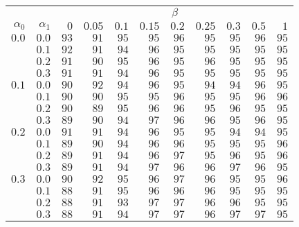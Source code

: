 \begin{tabular}{rr|rrrrrrrrr}
\hline\hline
 && \multicolumn{9}{c}{$\beta$}\\
 $\alpha_0$ & $\alpha_1$ & $0$ & $0.05$ & $0.1$ & $0.15$ & $0.2$ & $0.25$ & $0.3$ & $0.5$ & $1$ \\ 
 \hline
$0.0$ & $0.0$ & $93$ & $91$ & $95$ & $95$ & $96$ & $95$ & $95$ & $96$ & $95$\\ 
 & $0.1$ & $92$ & $91$ & $94$ & $96$ & $95$ & $95$ & $95$ & $95$ & $95$\\ 
 & $0.2$ & $91$ & $90$ & $95$ & $96$ & $95$ & $96$ & $95$ & $95$ & $95$\\ 
 & $0.3$ & $91$ & $91$ & $94$ & $96$ & $95$ & $95$ & $95$ & $95$ & $95$\\ 
\hline 
 $0.1$ & $0.0$ & $90$ & $92$ & $94$ & $96$ & $95$ & $94$ & $94$ & $96$ & $95$\\ 
 & $0.1$ & $90$ & $90$ & $95$ & $95$ & $96$ & $95$ & $95$ & $96$ & $96$\\ 
 & $0.2$ & $90$ & $89$ & $95$ & $96$ & $96$ & $95$ & $96$ & $95$ & $95$\\ 
 & $0.3$ & $89$ & $90$ & $94$ & $97$ & $96$ & $96$ & $95$ & $96$ & $95$\\ 
\hline 
 $0.2$ & $0.0$ & $91$ & $91$ & $94$ & $96$ & $95$ & $95$ & $94$ & $94$ & $95$\\ 
 & $0.1$ & $89$ & $90$ & $94$ & $96$ & $96$ & $95$ & $95$ & $95$ & $96$\\ 
 & $0.2$ & $89$ & $91$ & $94$ & $96$ & $97$ & $95$ & $96$ & $95$ & $96$\\ 
 & $0.3$ & $89$ & $91$ & $94$ & $97$ & $96$ & $96$ & $97$ & $96$ & $95$\\ 
\hline 
 $0.3$ & $0.0$ & $90$ & $92$ & $95$ & $96$ & $97$ & $96$ & $95$ & $95$ & $96$\\ 
 & $0.1$ & $88$ & $91$ & $95$ & $96$ & $96$ & $96$ & $95$ & $95$ & $95$\\ 
 & $0.2$ & $88$ & $91$ & $93$ & $97$ & $97$ & $96$ & $96$ & $95$ & $95$\\ 
 & $0.3$ & $88$ & $91$ & $94$ & $97$ & $97$ & $96$ & $97$ & $97$ & $95$\\ 
 \hline 
 \end{tabular}